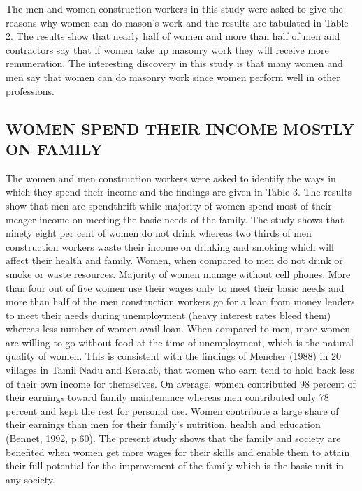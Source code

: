 \documentclass[12pt]{report}
\begin{document}
	The  men  and  women  construction  workers  in  this  study  were  asked  to  give  the reasons  why  women  can  do  mason’s  work  and  the  results  are  tabulated  in  Table  2.  The results  show  that  nearly  half  of  women  and  more  than  half  of  men  and  contractors  say that  if  women  take  up  masonry  work  they  will  receive  more  remuneration.  The interesting  discovery  in  this  study  is  that  many  women  and  men  say  that  women  can  do masonry  work  since  women  perform  well  in  other  professions.   
	
	
	\subsection{WOMEN  SPEND  THEIR  INCOME  MOSTLY  ON  FAMILY}
	The  women  and  men  construction  workers  were  asked  to  identify  the  ways  in which  they  spend  their  income  and  the  findings  are  given  in  Table  3.  The  results  show that  men  are  spendthrift  while  majority  of  women  spend  most  of  their  meager  income  on meeting  the  basic  needs  of  the  family.       The  study  shows  that  ninety  eight  per  cent  of  women  do  not  drink  whereas  two thirds  of  men  construction  workers  waste  their  income  on  drinking  and  smoking  which will  affect  their  health  and  family.  Women,  when  compared  to  men  do  not  drink  or smoke  or  waste  resources.  Majority  of  women  manage  without  cell  phones.  More  than four  out  of  five  women  use  their  wages  only  to  meet  their  basic  needs  and  more  than  half of  the  men  construction  workers  go  for  a  loan  from  money  lenders  to  meet  their  needs during  unemployment  (heavy  interest  rates  bleed  them)    whereas  less  number  of  women avail  loan.  When  compared  to  men,  more  women  are  willing  to  go  without  food  at  the time  of  unemployment,  which  is  the  natural  quality  of  women.   This  is  consistent  with  the  findings    of  Mencher  (1988)  in  20  villages  in  Tamil Nadu  and  Kerala6,    that  women  who  earn  tend  to  hold  back  less  of  their  own  income  for themselves.    On  average,  women  contributed  98  percent  of  their  earnings  toward  family maintenance  whereas  men  contributed  only  78  percent  and  kept  the  rest  for  personal  use. Women  contribute  a  large  share  of  their  earnings  than  men  for  their  family’s  nutrition, health  and  education  (Bennet,  1992,  p.60).  The  present  study  shows  that  the  family  and society  are  benefited  when  women  get  more  wages  for  their  skills  and  enable  them  to attain  their  full  potential  for  the  improvement  of  the  family  which  is  the  basic  unit  in  any society. 
	   
\end{document}
